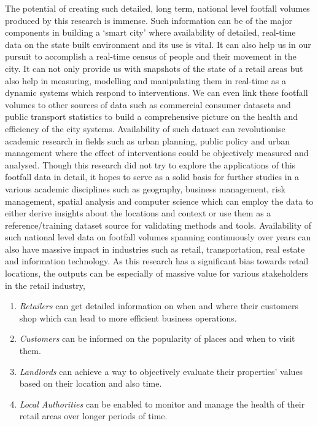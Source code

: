 
The potential of creating such detailed, long term, national level footfall volumes produced by this research is immense.
Such information can be of the major components in building a `smart city' where  availability of detailed, real-time data on the state built environment and its use is vital.
It can also help us in our pursuit to accomplish a real-time census of people and their movement in the city.
It can not only provide us with snapshots of the state of a retail areas but also help in measuring, modelling and manipulating them in real-time as a dynamic systems which respond to interventions.
We can even link these footfall volumes to other sources of data such as commercial consumer datasets and public transport statistics to build a comprehensive picture on the health and efficiency of the city systems.
Availability of such dataset can revolutionise academic research in fields such as urban planning, public policy and urban management where the effect of interventions could be objectively measured and analysed.
Though this research did not try to explore the applications of this footfall data in detail, it hopes to serve as a solid basis for further studies in a various academic disciplines such as geography, business management, risk management, spatial analysis and computer science which can employ the data to either derive insights about the locations and context or use them as a reference/training dataset source for validating methods and tools.
Availability of such national level data on footfall volumes spanning continuously over years can also have massive impact in industries such as retail, transportation, real estate and information technology.
As this research has a significant bias towards retail locations, the outputs can be especially of massive value for various stakeholders in the retail industry,

\begin{enumerate}[leftmargin=2em, rightmargin=0.5em]
  \itemsep-0.25em
  \item \textit{Retailers} can get detailed information on when and where their customers shop which can lead to more efficient business operations.
  \item \textit{Customers} can be informed on the popularity of places and when  to visit them.
  \item \textit{Landlords} can achieve a way to objectively evaluate their properties' values based on their location and also time.
  \item \textit{Local Authorities} can be enabled to monitor and manage the health of their retail areas over longer periods of time. 
\end{enumerate}

